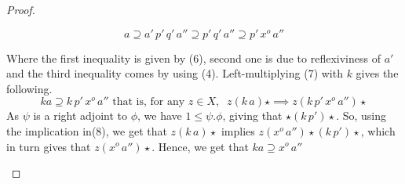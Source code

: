 \documentclass[18pt,a4paper]{article}
\theoremstyle{definition}
\begin{document}
\begin{proof}
\begin{enumerate}[label=(\roman*)]
				\begin{equation}
					a\supseteq a'\,p'\,q'\,a'' \supseteq p'\,q'\,a''
					\supseteq p' \,x^o \,a''
				\end{equation}

				Where the first inequality is given by (6), second one
				is due to reflexiviness	of $a'$ and the third inequality comes by using (4).
				Left-multiplying (7) with $k$ gives the following.
				\begin{equation}
					ka \supseteq k\,p'\,x^o\,a'' \text{ that is, for any } z\in X,
					\; \; z (k\, a) \star \implies z ( k\,p'\,x^o\,a'') \star
				\end{equation}
				As $\psi$ is a right adjoint to $\phi$, we have $1\leq \psi.\phi$, giving that
				$\star (k \, p' )\star $. So, using the implication in(8), we get that
				$z(k\, a) \star $ implies $z ( x^o\,a'') \star (k\,p') \star$, which in turn
				gives that $z(x^o \, a'')\star$. Hence, we get that $ka \supseteq x^o\, a''$
				\qedhere
		\end{enumerate}
	\end{proof}
	
\end{document}
